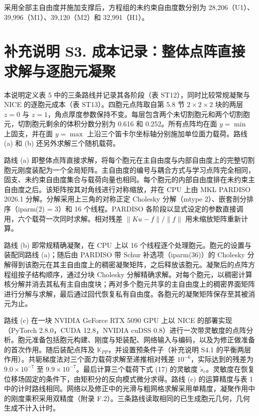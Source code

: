 \documentclass[preprint,12pt,authoryear]{elsarticle}
\begin{document}
采用全部主自由度并施加支撑后，方程组的未约束自由度数分别为 28,206（U1）、39,996（M1）、39,120（M2）和 32,991（H1）。

\section{补充说明 S3. 成本记录：整体点阵直接求解与逐胞元凝聚}

本说明定义表 5 中的三条路线并记录其各阶段（表 ST12），同时比较常规凝聚与 NICE 的逐胞元成本（表 ST13）。四胞元点阵取自第 5.8 节 \(2\times2\times2\) 块的两层 \(z=0\) 与 \(z=1\)，角点厚度参数保持不变。每层包含两个未切割胞元和两个切割胞元，切割胞元剩余的体积分数分别为 0.616 和 0.252。所有点阵均在面 \(y=\min\) 上固支，并在面 \(y=\max\) 上沿三个笛卡尔坐标轴分别施加单位面力载荷。路线 (a) 和 (b) 还另外求解三个随机载荷。

路线 (a) 即整体点阵直接求解，将每个胞元在主自由度与内部自由度上的完整切割胞元刚度装配为一个全局矩阵。主自由度的编号与耦合方式与学习点阵完全相同，固支、未约束自由度集合与载荷向量也相同。每个胞元的内部自由度排在未约束主自由度之后。该矩阵按其对角线进行对称缩放，并在 CPU 上由 MKL PARDISO 2026.1 分解。分解采用上三角的对称正定 Cholesky 分解（mtype 2）、嵌套剖分排序（iparm(2) = 3）和 16 个线程。PARDISO 各阶段以显式设定的参数直接调用，六个载荷一次同时求解。相对残差 \(\|Ku-f\|/\|f\|\) 用未缩放矩阵重新计算。

路线 (b) 即常规精确凝聚，在 CPU 上以 16 个线程逐个处理胞元。胞元的设置与装配同路线 (a)；随后由 PARDISO 带 Schur 补选项（iparm(36)）的 Cholesky 分解得到该胞元在其主自由度上的稠密凝聚矩阵，之后释放该胞元。凝聚后的点阵方程组按子结构顺序，通过分块 Cholesky 分解精确求解。对每个胞元，以稠密计算核分解并消去其私有主自由度块；再对多个胞元共享的主自由度上的稠密界面矩阵进行分解与求解，最后通过回代恢复私有自由度。各胞元的凝聚矩阵保存至其被消元为止。

路线 (c) 在一块 NVIDIA GeForce RTX 5090 GPU 上以 NICE 的部署实现（PyTorch 2.8.0，CUDA 12.8，NVIDIA cuDSS 0.8）进行一次带灵敏度的点阵分析。胞元准备包括胞元构建、刚度与矩装配、网络输入与编码，以及为修正做准备的首次作用。随后装配点阵及 \(\mathbb K_{PP}\)，并设置预条件子（补充说明 S4.1 的平衡两层作用）。共轭梯度法对三个面力载荷求解至递推相对残差 \(10^{-6}\)，实际达到的残差为 \(9.0\times10^{-7}\) 至 \(9.9\times10^{-7}\)。最后计算三个载荷下式 (17) 的灵敏度 \(\widetilde s_c\)。灵敏度在恢复位移场固定的条件下，由矩积分的反向模式微分求得。路线 (c) 的运算精度与表 1 中的计时路线相同。网络以及修正中的光滑与粗网格求解采用单精度，凝聚作用中的刚度乘积采用双精度（附录 F.2）。三条路线读取相同的已生成胞元几何，几何生成不计入计时。
\end{document}
